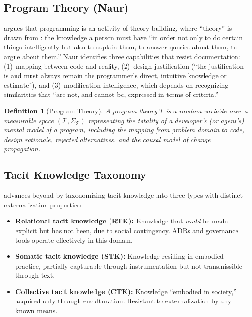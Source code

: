 \documentclass[11pt, a4paper, copyright]{googledeepmind}
\newtheorem{definition}{Definition}[section]
\begin{document}
\subsection{Program Theory (Naur)}

\citet{naur1985} argues that programming is an activity of theory building, where ``theory'' is drawn from \citet{ryle1949}: the knowledge a person must have ``in order not only to do certain things intelligently but also to explain them, to answer queries about them, to argue about them.'' Naur identifies three capabilities that resist documentation: (1)~mapping between code and reality, (2)~design justification (``the justification is and must always remain the programmer's direct, intuitive knowledge or estimate''), and (3)~modification intelligence, which depends on recognizing similarities that ``are not, and cannot be, expressed in terms of criteria.''

\begin{definition}[Program Theory]
\label{def:theory}
A \emph{program theory} $T$ is a random variable over a measurable space $(\mathcal{T}, \Sigma_{\mathcal{T}})$ representing the totality of a developer's (or agent's) mental model of a program, including the mapping from problem domain to code, design rationale, rejected alternatives, and the causal model of change propagation.
\end{definition}

\subsection{Tacit Knowledge Taxonomy}

\citet{collins2010} advances beyond \citet{polanyi1966} by taxonomizing tacit knowledge into three types with distinct externalization properties:

\begin{itemize}
    \item \textbf{Relational tacit knowledge (RTK):} Knowledge that \emph{could} be made explicit but has not been, due to social contingency. ADRs and governance tools operate effectively in this domain.
    \item \textbf{Somatic tacit knowledge (STK):} Knowledge residing in embodied practice, partially capturable through instrumentation but not transmissible through text.
    \item \textbf{Collective tacit knowledge (CTK):} Knowledge ``embodied in society,'' acquired only through enculturation. Resistant to externalization by any known means.
\end{itemize}
\end{document}
